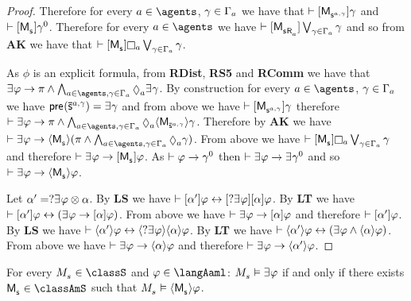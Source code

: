 \begin{proof}
Therefore for every $\agentA \in \agents$, $\gamma \in \Gamma_a$ we have that $\proves \actionA{\aPModel{\aStateS[\agentA,\gamma]}} \gamma$ and $\proves \actionA{\aPModel{\aStateS}} \gamma^0$.
Therefore for every $\agentA \in \agents$ we have $\proves \actionA{\aPModel{\aStateS \aAccessibility{\agentA}}} \bigvee_{\gamma \in \Gamma_\agentA} \gamma$ and so from {\bf AK} we have that $\proves \actionA{\aPModel{\aStateS}} \necessaryA \bigvee_{\gamma \in \Gamma_\agentA} \gamma$.

As $\phi$ is an explicit formula, from {\bf RDist}, {\bf RS5} and {\bf RComm} we have that $\somerefs \phi \implies \pi \land \bigwedge_{\agentA \in \agents, \gamma \in \Gamma_\agentA} \possibleA \somerefs \gamma$.
By construction for every $\agentA \in \agents$, $\gamma \in \Gamma_a$ we have $\aPrecondition(\aPStateS[\agentA,\gamma]) = \somerefs \gamma$ and from above we have $\proves \actionA{\aPModel{\aStateS[\agentA,\gamma]}} \gamma$ therefore $\proves \somerefs \phi \implies \pi \land \bigwedge_{\agentA \in \agents, \gamma \in \Gamma_\agentA} \possibleA \actionE{\aPModel{\aPStateS[\agentA,\gamma]}} \gamma$.
Therefore by {\bf AK} we have $\proves \somerefs \phi \implies \actionE{\aPModel{\aStateS}} (\pi \land \bigwedge_{\agentA \in \agents, \gamma \in \Gamma_\agentA} \possibleA \gamma)$.
From above we have $\proves \actionA{\aPModel{\aStateS}} \necessaryA \bigvee_{\gamma \in \Gamma_\agentA} \gamma$ and therefore $\proves \somerefs \phi \implies \actionA{\aPModel{\aStateS}} \phi$.
As $\vdash \varphi \rightarrow \gamma^0$ then $\proves \somerefs \phi \implies \somerefs \gamma^0$ and so $\proves \somerefs \phi \implies \actionE{\aPModel{\aStateS}} \phi$.

Let $\alpha' = \test{\somerefs \phi} \compose \alpha$.
By {\bf LS} we have $\proves \actionA{\alpha'} \phi \iff \actionA{\test{\somerefs \phi}} \actionA{\alpha} \phi$.
By {\bf LT} we have $\proves \actionA{\alpha'} \phi \iff (\somerefs \phi \implies \actionA{\alpha} \phi)$.
From above we have $\proves \somerefs \phi \implies \actionA{\alpha} \phi$ and therefore $\vdash {[ {\alpha'} ]} \varphi$.
By {\bf LS} we have $\proves \actionE{\alpha'} \phi \iff \actionE{\test{\somerefs \phi}} \actionE{\alpha} \phi$.
By {\bf LT} we have $\proves \actionE{\alpha'} \phi \iff (\somerefs \phi \land \actionE{\alpha} \phi)$.
From above we have $\proves \somerefs \phi \implies \actionE{\alpha} \phi$ and therefore $\proves \somerefs \phi \implies \actionE{\alpha'} \phi$.
\end{proof}

\begin{corollary}
For every $\kPModel{\kStateS} \in \classS$ and $\phi \in \langAaml$: $\kPModel{\kStateS} \entails \somerefs \phi$ if and only if there exists $\aPModel{\aStateS} \in \classAmS$ such that $\kPModel{\kStateS} \entails \actionE{\aPModel{\aStateS}} \phi$.
\end{corollary}

